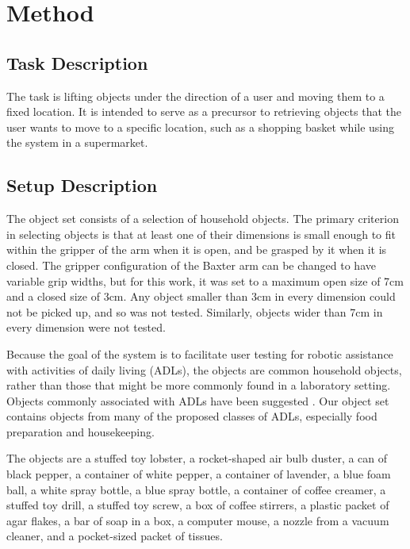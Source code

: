 \documentclass[letterpaper, 10 pt, conference]{ieeeconf}
\begin{document}
\section{Method}

\subsection{Task Description}

The task is lifting objects under the direction of a user and moving them to a fixed location. 
It is intended to serve as a precursor to retrieving objects that the user wants to move to a specific location, such as a shopping basket while using the system in a supermarket. 

\subsection{Setup Description}

The object set consists of a selection of household objects. The primary criterion in selecting objects is that at least one of their dimensions is small enough to fit within the gripper of the arm when it is open, and be grasped by it when it is closed. 
The gripper configuration of the Baxter arm can be changed to have variable grip widths, but for this work, it was set to a maximum open size of 7cm and a closed size of 3cm.
Any object smaller than 3cm in every dimension could not be picked up, and so was not tested. 
Similarly, objects wider than 7cm in every dimension were not tested. 


Because the goal of the system is to facilitate user testing for robotic assistance with activities of daily living (ADLs), the objects are common household objects, rather than those that might be more commonly found in a laboratory setting. 
Objects commonly associated with ADLs have been suggested \cite{matheus2010benchmarking, DBLP:journals/corr/CalliWSSAD15}.
Our object set contains objects from many of the proposed classes of ADLs, especially food preparation and housekeeping.

The objects are a stuffed toy lobster, a rocket-shaped air bulb duster, a can of black pepper, a container of white pepper, a container of lavender, a blue foam ball, a white spray bottle, a blue spray bottle, a container of coffee creamer, a stuffed toy drill, a stuffed toy screw, a box of coffee stirrers, a plastic packet of agar flakes, a bar of soap in a box, a computer mouse, a nozzle from a vacuum cleaner, and a pocket-sized packet of tissues. 
\end{document}
